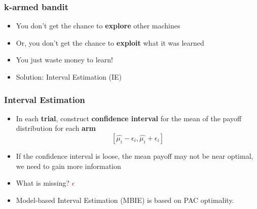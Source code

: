 \documentclass{beamer}
\newcommand{\tc}[2]{\textcolor{#1}{#2}}
\newcommand{\tcr}[1]{\tc{red}{#1}}
\begin{document}
\begin{frame}
	\frametitle{k-armed bandit}
	\begin{itemize}
		\item You don't get the chance to \textbf{explore} other machines
		\item Or, you don't get the chance to \textbf{exploit} what it was learned
		\item You just waste money to learn!
		\item Solution: Interval Estimation (IE)
	\end{itemize}

\end{frame}

\begin{frame}
	\frametitle{Interval Estimation}
	\begin{itemize}
		\item In each \textbf{trial}, construct \textbf{confidence interval} for the mean of the payoff distribution for each \textbf{arm}
		$$ [\hat{\mu_i} - \epsilon_i, \hat{\mu_i} + \epsilon_i] $$
		\item If the confidence interval is loose, the mean payoff may not be near optimal, we need to gain more information
		\item What is missing? \tcr{$\epsilon$}
		\item Model-based Interval Estimation (MBIE) is based on PAC optimality.
	\end{itemize}

\end{frame}
\end{document}
